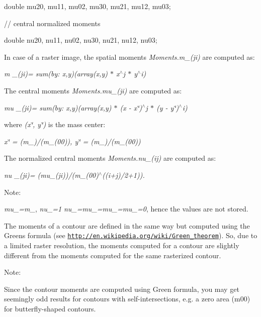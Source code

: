 {\ttfamily }

{\ttfamily }

{\ttfamily double mu20, mu11, mu02, mu30, mu21, mu12, mu03;}

{\ttfamily }

{\ttfamily }

{\ttfamily // central normalized moments}

{\ttfamily }

{\ttfamily }

{\ttfamily double nu20, nu11, nu02, nu30, nu21, nu12, nu03;}

{\ttfamily }

{\ttfamily }

{\ttfamily In case of a raster image, the spatial moments {\itshape Moments.\+m\+\_\+(ji)} are computed as\+: }

{\itshape m \+\_\+(ji)= sum(by\+: x,y)(array(x,y) $\ast$ x$^\wedge$j $\ast$ y$^\wedge$i)}

The central moments {\itshape Moments.\+mu\+\_\+(ji)} are computed as\+:

{\itshape mu \+\_\+(ji)= sum(by\+: x,y)(array(x,y) $\ast$ (x -\/ x\char`\"{})$^\wedge$j $\ast$ (y -\/ y\char`\"{})$^\wedge$i)}

where {\itshape (x\char`\"{}, y\char`\"{})} is the mass center\+:

{\itshape x\char`\"{} = (m\+\_)/(m\+\_\+(00)), y\char`\"{} = (m\+\_)/(m\+\_\+(00))}

The normalized central moments {\itshape Moments.\+nu\+\_\+(ij)} are computed as\+:

{\itshape nu \+\_\+(ji)= (mu\+\_\+(ji))/(m\+\_\+(00)$^\wedge$((i+j)/2+1)).}

Note\+:

{\itshape mu\+\_=m\+\_}, {\itshape nu\+\_=1} {\itshape nu\+\_=mu\+\_=mu\+\_=mu\+\_=0}, hence the values are not stored.

The moments of a contour are defined in the same way but computed using the Green\textquotesingle{}s formula (see \href{http://en.wikipedia.org/wiki/Green_theorem}{\tt http\+://en.\+wikipedia.\+org/wiki/\+Green\+\_\+theorem}). So, due to a limited raster resolution, the moments computed for a contour are slightly different from the moments computed for the same rasterized contour.

Note\+:

Since the contour moments are computed using Green formula, you may get seemingly odd results for contours with self-\/intersections, e.\+g. a zero area ({\ttfamily m00}) for butterfly-\/shaped contours.


